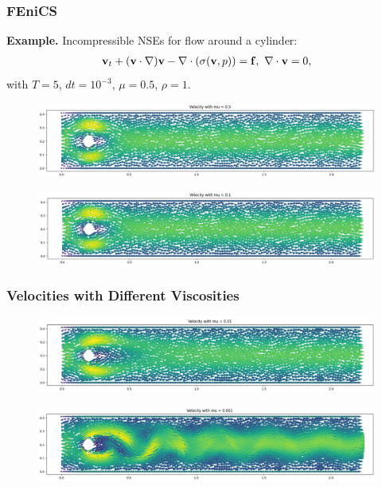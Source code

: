 \documentclass[t,xcolor=table,english]{beamer}   %
\begin{document}
\begin{frame}
	\frametitle{FEniCS}
	\textbf{Example.} Incompressible NSEs for flow around a cylinder:
	\begin{align*}
	{\bf v}_t + ({\bf v}\cdot\nabla){\bf v} - \nabla\cdot(\sigma({\bf v},p)) = {\bf f},\ \nabla\cdot{\bf v} = 0,
	\end{align*}
	with $T = 5$, $dt = 10^{-3}$, $\mu = 0.5$, $\rho = 1$.
	\begin{figure}
		\centering
		\includegraphics[width=\textwidth]{Velocity_05}
	\end{figure}

	\begin{figure}
		\centering
		\includegraphics[width=\textwidth]{Velocity_01}
	\end{figure}
\end{frame}

\begin{frame}
	\frametitle{Velocities with Different Viscosities}
	\begin{figure}
		\centering
		\includegraphics[width=\textwidth]{Velocity_001}
	\end{figure}
	
	\begin{figure}
		\centering
		\includegraphics[width=\textwidth]{Velocity_0001}
	\end{figure}
\end{frame}
\end{document}

